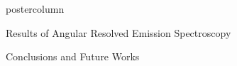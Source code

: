 \documentclass[10pt,papersize={24in,36in}]{beamer}
\begin{document}
\begin{frame}
\begin{columns}
\begin{column}{.49\textwidth}
\begin{beamercolorbox}[center,wd=\textwidth]{postercolumn}
\begin{minipage}[T]{.95\textwidth}
{\begin{block}{Results of Angular Resolved Emission Spectroscopy}
            \end{block}
            \vfill
            \begin{block}{Conclusions and Future Works}

\end{block}}
\end{minipage}
\end{beamercolorbox}
\end{column}
\end{columns}
\end{frame}
\end{document}
